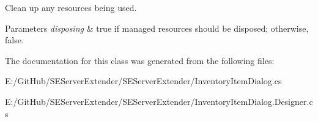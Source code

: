 Clean up any resources being used. 


\begin{DoxyParams}{Parameters}
{\em disposing} & true if managed resources should be disposed; otherwise, false.\\
\hline
\end{DoxyParams}


The documentation for this class was generated from the following files\+:\begin{DoxyCompactItemize}
\item 
E\+:/\+Git\+Hub/\+S\+E\+Server\+Extender/\+S\+E\+Server\+Extender/Inventory\+Item\+Dialog.\+cs\item 
E\+:/\+Git\+Hub/\+S\+E\+Server\+Extender/\+S\+E\+Server\+Extender/Inventory\+Item\+Dialog.\+Designer.\+cs\end{DoxyCompactItemize}

